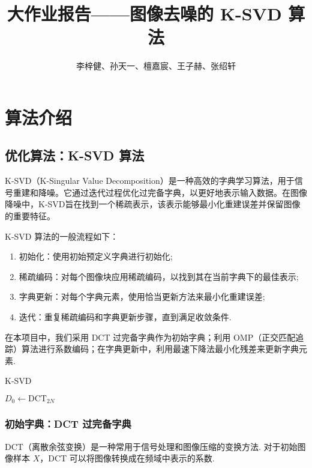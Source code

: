 \documentclass[10.5pt]{myarticle}
\title{\bf 大作业报告——图像去噪的 K-SVD 算法}
\author{李梓健、孙天一、檀嘉宸、王子赫、张绍轩}
\date{}
\begin{document}
	
\maketitle

\section{算法介绍}

\subsection{优化算法：K-SVD 算法}
K-SVD（K-Singular Value Decomposition）是一种高效的字典学习算法，用于信号重建和降噪。它通过迭代过程优化过完备字典，以更好地表示输入数据。在图像降噪中，K-SVD旨在找到一个稀疏表示，该表示能够最小化重建误差并保留图像的重要特征。

K-SVD 算法的一般流程如下：
\begin{enumerate}
	\item 初始化：使用初始预定义字典进行初始化;
	\item 稀疏编码：对每个图像块应用稀疏编码，以找到其在当前字典下的最佳表示;
	\item 字典更新：对每个字典元素，使用恰当更新方法来最小化重建误差;
	\item 迭代：重复稀疏编码和字典更新步骤，直到满足收敛条件. 
\end{enumerate}

在本项目中，我们采用 DCT 过完备字典作为初始字典；利用 OMP（正交匹配追踪）算法进行系数编码；在字典更新中，利用最速下降法最小化残差来更新字典元素.
 
\begin{algorithm}[H]
	\caption{K-SVD}
	\label{alg:ksvd}
	
	
	$D_0 \gets \mathrm{DCT}_{2N}$ 
\end{algorithm}

\subsubsection{初始字典：DCT 过完备字典}
DCT（离散余弦变换）是一种常用于信号处理和图像压缩的变换方法.  对于初始图像样本 $X$，DCT 可以将图像转换成在频域中表示的系数. 
\end{document}
